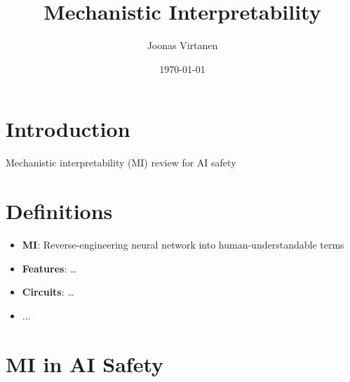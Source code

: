 \documentclass[12pt, a4paper]{article}
\title{Mechanistic Interpretability}
\author{Joonas Virtanen}
\date{\today}
\begin{document}
\maketitle

\section{Introduction}
Mechanistic interpretability (MI) review for AI safety \cite{bereska2024}

\section{Definitions}
\begin{itemize}
    \item \textbf{MI}: Reverse-engineering neural network into human-understandable terms
    \item \textbf{Features}: \dots
    \item \textbf{Circuits}: \dots
    \item ...
\end{itemize}

\section{MI in AI Safety}
\end{document}
